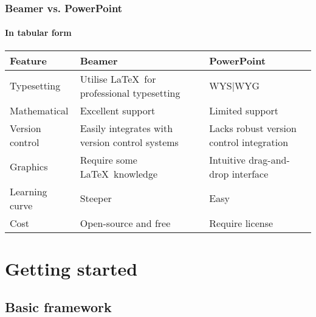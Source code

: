 \documentclass[aspectratio=1610]{beamer}
\begin{document}
\begin{frame}
    \frametitle{Beamer vs. PowerPoint}
    \framesubtitle{In tabular form}
    \begin{table}
        \arrayrulewidth=1pt
        \begin{tabular}{l p{} p{}}
            \hline
            \rowcolor{lightBlue}
            \textbf{Feature} & \textbf{Beamer}                                & \textbf{PowerPoint}                      \\
            \hline
            Typesetting      & Utilise \LaTeX\ for professional typesetting   & WYS$\vert$WYG                            \\
            Mathematical     & Excellent support                              & Limited support                          \\
            Version control  & Easily integrates with version control systems & Lacks robust version control integration \\
            Graphics         & Require some \LaTeX\ knowledge                 & Intuitive drag-and-drop interface        \\
            Learning curve   & Steeper                                        & Easy                                     \\
            Cost             & Open-source and free                           & Require license                          \\
            \hline
        \end{tabular}
    \end{table}
\end{frame}

\section{Getting started}

\subsection{Basic framework}

\end{document}
